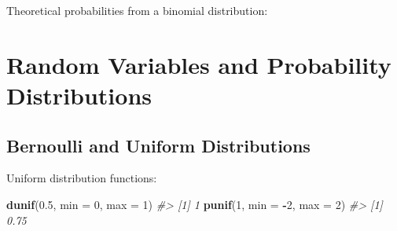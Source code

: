 \documentclass[]{book}
\newenvironment{Shaded}{\begin{snugshade}}{\end{snugshade}}
\newcommand{\KeywordTok}[1]{\textcolor[rgb]{0.13,0.29,0.53}{\textbf{#1}}}
\newcommand{\DataTypeTok}[1]{\textcolor[rgb]{0.13,0.29,0.53}{#1}}
\newcommand{\DecValTok}[1]{\textcolor[rgb]{0.00,0.00,0.81}{#1}}
\newcommand{\FloatTok}[1]{\textcolor[rgb]{0.00,0.00,0.81}{#1}}
\newcommand{\StringTok}[1]{\textcolor[rgb]{0.31,0.60,0.02}{#1}}
\newcommand{\CommentTok}[1]{\textcolor[rgb]{0.56,0.35,0.01}{\textit{#1}}}
\newcommand{\OtherTok}[1]{\textcolor[rgb]{0.56,0.35,0.01}{#1}}
\newcommand{\OperatorTok}[1]{\textcolor[rgb]{0.81,0.36,0.00}{\textbf{#1}}}
\newcommand{\NormalTok}[1]{#1}
\theoremstyle{definition}
\theoremstyle{definition}
\theoremstyle{definition}
\theoremstyle{remark}
\begin{document}
Theoretical probabilities from a binomial distribution:

\begin{Shaded}
\end{Shaded}

\section{Random Variables and Probability
Distributions}\label{random-variables-and-probability-distributions}

\subsection{Bernoulli and Uniform
Distributions}\label{bernoulli-and-uniform-distributions}

Uniform distribution functions:

\begin{Shaded}
\begin{Highlighting}[]
\KeywordTok{dunif}\NormalTok{(}\FloatTok{0.5}\NormalTok{, }\DataTypeTok{min =} \DecValTok{0}\NormalTok{, }\DataTypeTok{max =} \DecValTok{1}\NormalTok{)}
\CommentTok{#> [1] 1}
\KeywordTok{punif}\NormalTok{(}\DecValTok{1}\NormalTok{, }\DataTypeTok{min =} \OperatorTok{-}\DecValTok{2}\NormalTok{, }\DataTypeTok{max =} \DecValTok{2}\NormalTok{)}
\CommentTok{#> [1] 0.75}
\end{Highlighting}
\end{Shaded}
\end{document}
